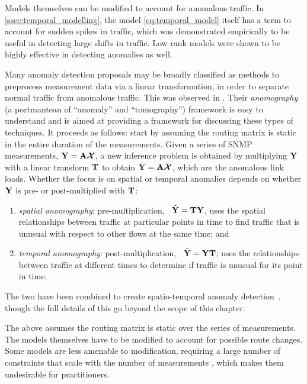 
Models themselves can be modified to account for anomalous traffic. In
\autoref{ssec:temporal_modelling}, the model \eqref{eq:temporal_model}
itself has a term to account for sudden spikes in traffic, which was
demonstrated empirically to be useful in detecting large shifts in
traffic. Low rank models \cite{Zhang09TMCS} were shown to be highly
effective in detecting anomalies as well. 

Many anomaly detection proposals may be broadly classified as methods
to preprocess measurement data via a linear transformation, in order
to separate normal traffic from anomalous traffic. This was observed
in \cite{Zhang05Anomography}.  Their \emph{anomography} (a portmanteau
of ``anomaly'' and ``tomography'') framework is easy to understand and
is aimed at providing a framework for discussing these types of
techniques. It proceeds as follows: start by assuming the routing
matrix is static in the entire duration of the measurements. Given a
series of SNMP measurements, $\mathbf{Y} = \mathbf{A} \boldsymbol{\mathcal{X}}$, a new inference problem
is obtained by multiplying $\mathbf{Y}$ with a linear transform $\mathbf{T}$ to
obtain $ \tilde {\mathbf{Y}} = \mathbf{A} \tilde {\boldsymbol{\mathcal{X}}}$, which are the anomalous link
loads. Whether the focus is on spatial or temporal anomalies depends
on whether $\mathbf{Y}$ is pre- or post-multiplied with $\mathbf{T}$:
\begin{enumerate}
\item \textit{spatial anomography}: pre-multiplication, \ie~$\tilde
  {\mathbf{Y}} = \mathbf{T} \mathbf{Y}$, uses the spatial relationships between traffic at
  particular points in time to find traffic that is unusual with
  respect to other flows at the same time; and 
\item \textit{temporal anomography}: post-multiplication, \ie~$\tilde
  {\mathbf{Y}} =  \mathbf{Y} \mathbf{T}$; uses the relationships between traffic at different
  times to determine if traffic is unusual for its point in time.
\end{enumerate}
The two have been combined to create spatio-temporal anomaly
detection~\cite{Zhang09TMCS}, though the full details of this go
beyond the scope of this chapter.

The above assumes the routing matrix is static over the series of
measurements. The models themselves have to be modified to account for
possible route changes. Some models are less amenable to modification,
requiring a large number of constraints that scale with the number of
measurements \cite{Zhang05Anomography}, which makes them undesirable
for practitioners.

